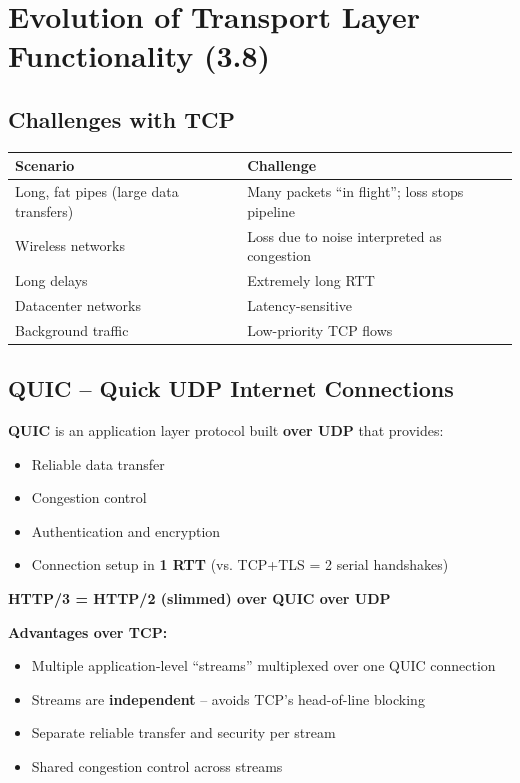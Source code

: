 \section{Evolution of Transport Layer Functionality (3.8)}

\subsection{Challenges with TCP}

\begin{keybox}
\begin{center}
\begin{tabular}{ll}
\toprule
\textbf{Scenario} & \textbf{Challenge} \\
\midrule
Long, fat pipes (large data transfers) & Many packets ``in flight''; loss stops pipeline \\
Wireless networks & Loss due to noise interpreted as congestion \\
Long delays & Extremely long RTT \\
Datacenter networks & Latency-sensitive \\
Background traffic & Low-priority TCP flows \\
\bottomrule
\end{tabular}
\end{center}
\end{keybox}

\subsection{QUIC -- Quick UDP Internet Connections}

\begin{keybox}
\textbf{QUIC} is an application layer protocol built \textbf{over UDP} that provides:
\begin{itemize}[noitemsep]
    \item Reliable data transfer
    \item Congestion control
    \item Authentication and encryption
    \item Connection setup in \textbf{1 RTT} (vs. TCP+TLS = 2 serial handshakes)
\end{itemize}

\textbf{HTTP/3 = HTTP/2 (slimmed) over QUIC over UDP}

\textbf{Advantages over TCP:}
\begin{itemize}[noitemsep]
    \item Multiple application-level ``streams'' multiplexed over one QUIC connection
    \item Streams are \textbf{independent} -- avoids TCP's head-of-line blocking
    \item Separate reliable transfer and security per stream
    \item Shared congestion control across streams
\end{itemize}
\end{keybox}


